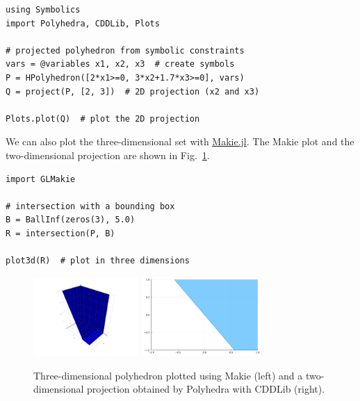\begin{minipage}{\linewidth}
\begin{lstlisting}
using Symbolics
import Polyhedra, CDDLib, Plots

# projected polyhedron from symbolic constraints
vars = @variables x1, x2, x3  # create symbols
P = HPolyhedron([2*x1>=0, 3*x2+1.7*x3>=0], vars)
Q = project(P, [2, 3])  # 2D projection (x2 and x3)

Plots.plot(Q)  # plot the 2D projection
\end{lstlisting}
\end{minipage}

We can also plot the three-dimensional set with \href{https://github.com/JuliaPlots/Makie.jl}{Makie.jl}.
The Makie plot and the two-dimensional projection are shown in Fig.~\ref{fig:polyhedra}.

\begin{minipage}{\linewidth}
\begin{lstlisting}
import GLMakie

# intersection with a bounding box
B = BallInf(zeros(3), 5.0)
R = intersection(P, B)

plot3d(R)  # plot in three dimensions
\end{lstlisting}
\end{minipage}

\begin{figure}
	\centering
	\hfill
	\includegraphics[width=0.49\linewidth, height=3cm, keepaspectratio,clip,trim=65mm 14mm 62mm 19mm]{img/polyhedron3D}
	\hfill
	\includegraphics[width=0.49\linewidth, height=3cm, keepaspectratio]{img/polyhedron2D}
	\hfill\,
	\vspace*{1mm}
	\caption{Three-dimensional polyhedron plotted using Makie (left) and a two-dimensional projection obtained by Polyhedra with CDDLib (right).}
	\label{fig:polyhedra}
\end{figure}

